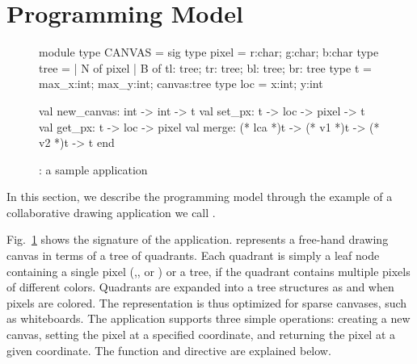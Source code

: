 \section{Programming Model}

\begin{figure}
\begin{center}
  \begin{ocaml}
  module type CANVAS = sig
    type pixel = {r:char; g:char; b:char}
    type tree = 
      | N of pixel
      | B of {tl: tree; tr: tree; bl: tree; br: tree} 
    type t = {max_x:int; max_y:int; canvas:tree} 
    type loc = {x:int; y:int}
  
    val new_canvas: int -> int -> t
    val set_px: t -> loc -> pixel -> t
    val get_px: t -> loc -> pixel
    val merge: (* lca *)t -> (* v1 *)t -> (* v2 *)t -> t
  end
  \end{ocaml}
\end{center}
\caption{\drawsome: a sample \name application}
\label{fig:canvas-sig}
\end{figure}

In this section, we describe the \name programming model through the
example of a collaborative drawing application we call \drawsome.

Fig.~\ref{fig:canvas-sig} shows the signature of the \drawsome
application. \drawsome represents a free-hand drawing canvas in terms
of a tree of quadrants.  Each quadrant is simply a leaf node
containing a single pixel (,, or ) or a tree, if the
quadrant contains multiple pixels of different colors. Quadrants are
expanded into a tree structures as and when pixels are colored.  The
representation is thus optimized for sparse canvases, such as
whiteboards. The application supports three simple operations:
creating a new canvas, setting the pixel at a specified coordinate,
and returning the pixel at a given coordinate. The  function
and  directive are explained below.

